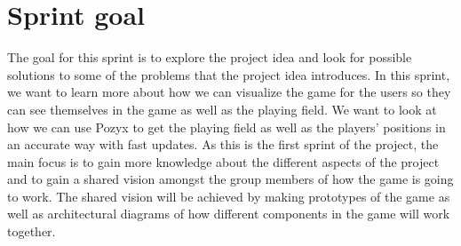 \section{Sprint goal}
The goal for this sprint is to explore the project idea and look for possible solutions to some of the problems that the project idea introduces.
In this sprint, we want to learn more about how we can visualize the game for the users so they can see themselves in the game as well as the playing field.
We want to look at how we can use Pozyx to get the playing field as well as the players' positions in an accurate way with fast updates.
As this is the first sprint of the project, the main focus is to gain more knowledge about the different aspects of the project and to gain a shared vision amongst the group members of how the game is going to work.
The shared vision will be achieved by making prototypes of the game as well as architectural diagrams of how different components in the game will work together.
